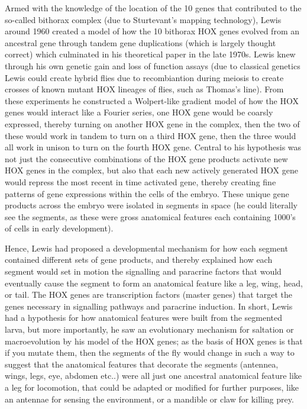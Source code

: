 Armed with the knowledge of the location of the 10 genes that contributed to the so-called bithorax complex (due to Sturtevant's mapping technology), Lewis around 1960 created a model of how the 10 bithorax HOX genes evolved from an ancestral gene through tandem gene duplications (which is largely thought correct) which culminated in his theoretical paper in the late 1970s.  Lewis knew through his own genetic gain and loss of function assays (due to classical genetics Lewis could create hybrid flies due to recombiantion during meiosis to create crosses of known mutant HOX lineages of flies, such as Thomas's line).  From these experiments he constructed a Wolpert-like gradient model of how the HOX genes would interact like a Fourier series, one HOX gene would be coarsly expressed, thereby turning on another HOX gene in the complex, then the two of these would work in tandem to turn on a third HOX gene, then the three would all work in unison to turn on the fourth HOX gene.  Central to his hypothesis was not just the consecutive combinations of the HOX gene products activate new HOX genes in the complex, but also that each new actively generated HOX gene would repress the most recent in time activated gene, thereby creating fine patterns of gene expressions within the cells of the embryo.  These unique gene products across the embryo were isolated in segments in space (he could literally see the segments, as these were gross anatomical features each containing 1000's of cells in early development).  

Hence, Lewis had proposed a developmental mechanism for how each segment contained different sets of gene products, and thereby explained how each segment would set in motion the signalling and paracrine factors that would eventually cause the segment to form an anatomical feature like a leg, wing, head, or tail.  The HOX genes are transcription factors (master genes) that target the genes necessary in signalling pathways and paracrine induction.   In short, Lewis had a hypothesis for how anatomical features were built from the segmented larva, but more importantly, he saw an evolutionary mechanism for saltation or macroevolution by his model of the HOX genes; as the basis of HOX genes is that if you mutate them, then the segments of the fly would change in such a way to suggest that the anatomical features that decorate the segments (antennea, wings, legs, eye, abdomen etc..) were all just one ancestral anatomical feature like a leg for locomotion, that could be adapted or modified for further purposes, like an antennae for sensing the environment, or a mandible or claw for killing prey.


